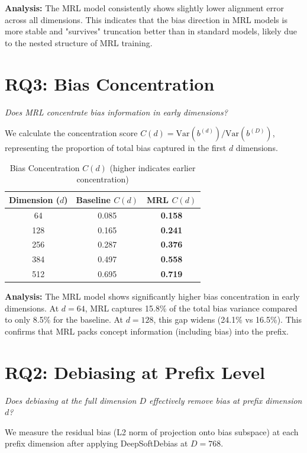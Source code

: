 \documentclass{article}
\begin{document}
\textbf{Analysis:} The MRL model consistently shows slightly lower alignment error across all dimensions. This indicates that the bias direction in MRL models is more stable and "survives" truncation better than in standard models, likely due to the nested structure of MRL training.

\section{RQ3: Bias Concentration}
\textit{Does MRL concentrate bias information in early dimensions?}

We calculate the concentration score $C(d) = \text{Var}(b^{(d)}) / \text{Var}(b^{(D)})$, representing the proportion of total bias captured in the first $d$ dimensions.

\begin{table}[H]
    \centering
    \caption{Bias Concentration $C(d)$ (higher indicates earlier concentration)}
    \begin{tabular}{c c c}
    \toprule
    Dimension ($d$) & Baseline $C(d)$ & MRL $C(d)$ \\
    \midrule
    64 & 0.085 & \textbf{0.158} \\
    128 & 0.165 & \textbf{0.241} \\
    256 & 0.287 & \textbf{0.376} \\
    384 & 0.497 & \textbf{0.558} \\
    512 & 0.695 & \textbf{0.719} \\
    \bottomrule
    \end{tabular}
\end{table}

\textbf{Analysis:} The MRL model shows significantly higher bias concentration in early dimensions. At $d=64$, MRL captures 15.8\% of the total bias variance compared to only 8.5\% for the baseline. At $d=128$, this gap widens (24.1\% vs 16.5\%). This confirms that MRL packs concept information (including bias) into the prefix.

\section{RQ2: Debiasing at Prefix Level}
\textit{Does debiasing at the full dimension $D$ effectively remove bias at prefix dimension $d$?}

We measure the residual bias (L2 norm of projection onto bias subspace) at each prefix dimension after applying DeepSoftDebias at $D=768$.
\end{document}
